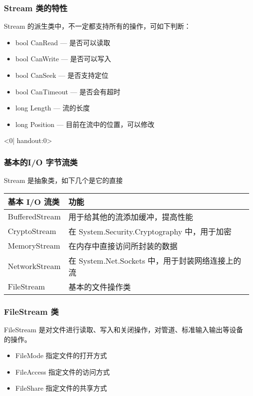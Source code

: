 \begin{frame}
\frametitle{Stream 类的特性}
Stream 的派生类中，不一定都支持所有的操作，可如下判断：
\begin{itemize}
\item bool CanRead --- 是否可以读取
\item bool CanWrite --- 是否可以写入
\item bool CanSeek --- 是否支持定位
\item bool CanTimeout --- 是否会有超时
\item long Length --- 流的长度
\item long Position --- 目前在流中的位置，可以修改
\end{itemize}
\end{frame}


\begin{frame}<0| handout:0>
\frametitle{基本的I/O 字节流类}
\color{red}

Stream 是抽象类，如下几个是它的直接

\begin{tabular}[htbp]{l|l}
\hline
基本 I/O 流类 & 功能                                                     \\
\hline
BufferedStream & \small 用于给其他的流添加缓冲，提高性能                  \\
CryptoStream   & \small 在 System.Security.Cryptography 中，用于加密     \\
MemoryStream   & \small 在内存中直接访问所封装的数据                      \\
NetworkStream  & \small 在 System.Net.Sockets 中，用于封装网络连接上的流 \\
FileStream     & \small 基本的文件操作类                                  \\
\hline
\end{tabular}

\end{frame}

\begin{frame}
\frametitle{FileStream 类}
{\CJKindent FileStream 是对文件进行读取、写入和关闭操作，对管道、标准输入输出等设备的操作。}
\begin{figure}
  \centering
  
\end{figure}
\begin{itemize}
\item FileMode 指定文件的打开方式
\item FileAccess 指定文件的访问方式
\item FileShare 指定文件的共享方式
\end{itemize}
\end{frame}

